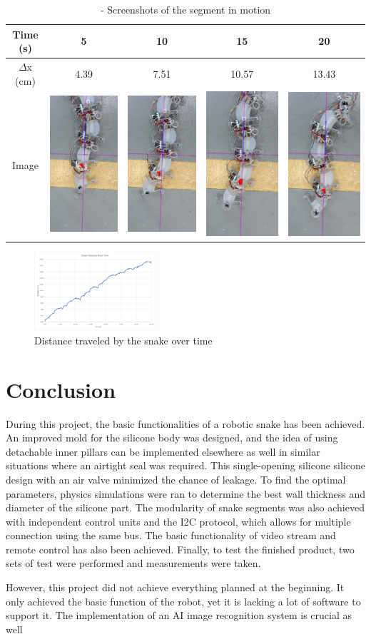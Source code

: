 \documentclass[twoside, 11pt]{article}
\begin{document}
\begin{table} [H]
	\centering
	\begin{tabular}{|c|c|c|c|c|}
	\hline
	Time (s) & 5 & 10 & 15 & 20\\
	\hline
	$\Delta$x (cm) & 4.39 & 7.51 & 10.57 & 13.43\\
	\hline
	Image & \includegraphics[align=c, scale=0.2]{5} & \includegraphics[align=c, scale=0.2]{10} & \includegraphics[align=c, scale=0.2]{15} & \includegraphics[align=c, scale=0.2]{20}\\
	\hline
	\end{tabular}
	\caption{- Screenshots of the segment in motion}
\end{table}

\begin{figure} [H]
\centering
\includegraphics[width=0.4\textwidth]{4 seg snake}
\caption{Distance traveled by the snake over time}
\end{figure}

\section{Conclusion}
During this project, the basic functionalities of a robotic snake has been achieved. An improved mold for the silicone body was designed, and the idea of using detachable inner pillars can be implemented elsewhere as well in similar situations where an airtight seal was required. This single-opening silicone silicone design with an air valve minimized the chance of leakage. To find the optimal parameters, physics simulations were ran to determine the best wall thickness and diameter of the silicone part. The modularity of snake segments was also achieved with independent control units and the I2C protocol, which allows for multiple connection using the same bus. The basic functionality of video stream and remote control has also been achieved. Finally, to test the finished product, two sets of test were performed and measurements were taken. 

However, this project did not achieve everything planned at the beginning. It only achieved the basic function of the robot, yet it is lacking a lot of software to support it. The implementation of an AI image recognition system is crucial as well 
\end{document}
